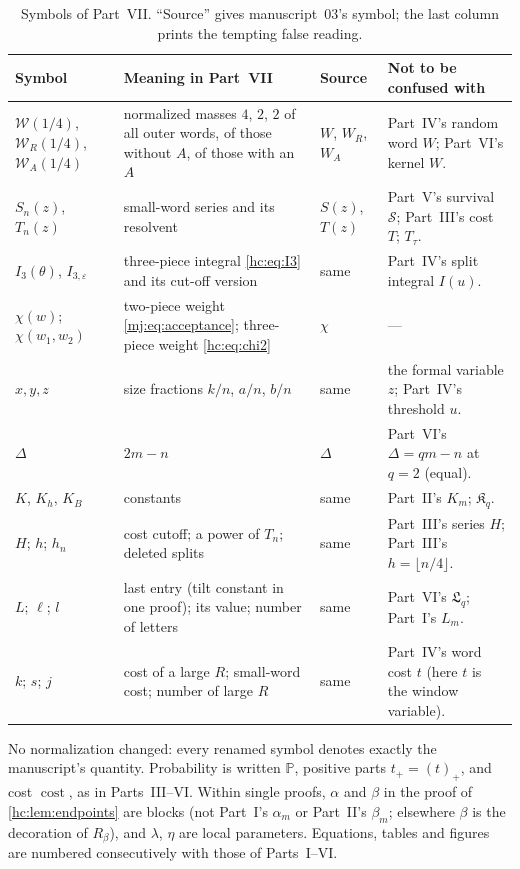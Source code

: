 \documentclass[11pt,a4paper]{article}
\theoremstyle{definition}\newaliascnt{definition}{theorem}
\theoremstyle{remark}\newaliascnt{remark}{theorem}
\newcommand{\ljP}{\mathbb P}
\newcommand{\ljcost}{\operatorname{cost}}
\newcommand{\prpos}[1]{(#1)_+}
\begin{document}
\begin{table}[htbp]
\centering\small
\caption{Symbols of Part~VII. ``Source'' gives manuscript~03's symbol; the
last column prints the tempting false reading.}
\label{hc:tab:notation}
\begin{tabular}{>{\raggedright}p{.19\linewidth}>{\raggedright}p{.29\linewidth}>{\raggedright}p{.12\linewidth}>{\raggedright\arraybackslash}p{.28\linewidth}}
\toprule
Symbol & Meaning in Part~VII & Source & Not to be confused with\\
\midrule
$\mathcal W(1/4)$, $\mathcal W_R(1/4)$, $\mathcal W_A(1/4)$ & normalized
 masses $4$, $2$, $2$ of all outer words, of those without $A$, of those
 with an $A$ & $W$, $W_R$, $W_A$ & Part~IV's random word $W$; Part~VI's
 kernel $W$.\\
$S_n(z)$, $T_n(z)$ & small-word series and its resolvent & $S(z)$, $T(z)$ &
 Part~V's survival $\mathcal S$; Part~III's cost $T$; $T_\tau$.\\
$I_3(\theta)$, $I_{3,\varepsilon}$ & three-piece integral \eqref{hc:eq:I3}
 and its cut-off version & same & Part~IV's split integral $I(u)$.\\
$\chi(w)$; $\chi(w_1,w_2)$ & two-piece weight \eqref{mj:eq:acceptance};
 three-piece weight \eqref{hc:eq:chi2} & $\chi$ & ---\\
$x,y,z$ & size fractions $k/n$, $a/n$, $b/n$ & same & the formal variable
 $z$; Part~IV's threshold $u$.\\
$\Delta$ & $2m-n$ & $\Delta$ & Part~VI's $\Delta=qm-n$ at $q=2$ (equal).\\
$K$, $K_h$, $K_B$ & constants & same & Part~II's $K_m$; $\mathfrak K_q$.\\
$H$; $h$; $h_n$ & cost cutoff; a power of $T_n$; deleted splits & same &
 Part~III's series $H$; Part~III's $h=\lfloor n/4\rfloor$.\\
$L$; $\ell$; $l$ & last entry (tilt constant in one proof); its value;
 number of letters & same & Part~VI's $\mathfrak L_q$; Part~I's $L_m$.\\
$k$; $s$; $j$ & cost of a large $R$; small-word cost; number of large $R$ &
 same & Part~IV's word cost $t$ (here $t$ is the window variable).\\
\bottomrule
\end{tabular}
\end{table}

No normalization changed: every renamed symbol denotes exactly the
manuscript's quantity. Probability is written $\ljP$, positive parts
$t_+=\prpos t$, and cost $\ljcost$, as in Parts~III--VI. Within single
proofs, $\alpha$ and $\beta$ in the proof of \cref{hc:lem:endpoints} are
blocks (not Part~I's $\alpha_m$ or Part~II's $\beta_m$; elsewhere $\beta$ is
the decoration of $R_\beta$), and $\lambda$, $\eta$ are local parameters.
Equations, tables and figures are numbered consecutively with those of
Parts~I--VI.
\end{document}
